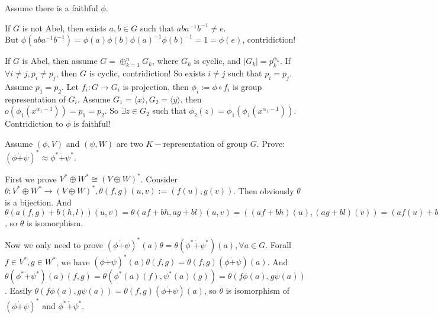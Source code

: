 \documentclass{ctexart}
\begin{document}
\begin{solution}
 Assume there is a faithful $\phi$. 
 
 If $G$ is not Abel, then exists $a,b\in G$ such that $aba^{-1}b^{-1}\neq e$. \\
 But $\phi(aba^{-1}b^{-1})=\phi(a)\phi(b)\phi(a)^{-1}\phi(b)^{-1}=1=\phi(e)$, contridiction! 

 If $G$ is Abel, then assume $G=\oplus_{k=1}^n G_k$, where $G_k$ is cyclic, and $|G_k|=p_k^{\alpha_k}$. If $\forall i\neq j, p_i\neq p_j$, then $G$ is cyclic, contridiction! So exists $i\neq j$ such that $p_i=p_j$. Assume $p_1= p_2$. Let $f_i:G\to G_i$ is projection, then $\phi_i:=\phi\circ f_i$ is group representation of $G_i$. Assume $G_1=\langle x\rangle,G_2=\langle y\rangle$, then $o(\phi_1(x^{\alpha_1-1}))=p_1=p_2$. So $\exists z\in G_2$ such that $\phi_2(z)=\phi_1(\phi_1(x^{\alpha_1-1}))$. Contridiction to $\phi$ is faithful! 
\end{solution}

\begin{problem}
 Assume $(\phi,V)$ and $(\psi,W)$ are two $K-$representation of group $G$. 
 Prove: $(\phi \dot{+}\psi)^*\approx \phi^*\dot{+}\psi^*$. 
\end{problem}

\begin{solution}
 First we prove $V^*\oplus W^*\cong(V\oplus W)^*$. Consider $\theta:V^*\oplus W^*\to(V\oplus W)^*,\theta(f,g)(u,v):=(f(u),g(v))$. Then obviously $\theta$ is a bijection. And $\theta(a(f,g)+b(h,l))(u,v)=\theta(af+bh,ag+bl)(u,v)=((af+bh)(u),(ag+bl)(v))=(af(u)+bh(u),ag(u)+bl(u))=a \theta(f,g)(u,v)+b \theta(h,l)(u,v)$, so $\theta$ is isomorphism. 

 Now we only need to prove $(\phi\dot{+}\psi)^*(a)\theta=\theta(\phi^*\dot{+}\psi^*)(a),\forall a\in G$. Forall $f\in V^*,g\in W^*$, we have $ (\phi\dot{+}\psi)^*(a)\theta(f,g)=\theta(f,g)(\phi\dot{+}\psi)(a)$. And $\theta(\phi^*\dot{+}\psi^*)(a)(f,g)=\theta(\phi^*(a)(f),\psi^*(a)(g))=\theta(f\phi(a),g\psi(a))$. Easily $\theta(f\phi(a),g\psi(a))=\theta(f,g)(\phi\dot{+}\psi)(a)$, so $\theta$ is isomorphism of $(\phi \dot{+}\psi)^*$ and $\phi^*\dot{+}\psi^*$. 
\end{solution}
\end{document}
